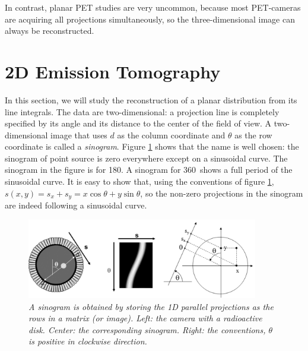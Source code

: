 \documentclass[11pt,oneside]{book}
\begin{document}
In contrast, planar PET studies are very uncommon, because most PET-cameras
are acquiring all projections simultaneously, so the three-dimensional image
can always be reconstructed.

\section{2D Emission Tomography}

In this section, we will study the reconstruction of a planar distribution
from its line integrals. The data are two-dimensional: a projection line is
completely specified by its angle and its distance to the center of the field
of view. A two-dimensional image that uses $d$ as the column coordinate and
$\theta$ as the row coordinate is called a {\em sinogram}. Figure
\ref{fig:sinogram} shows that the name is well chosen: the sinogram of point
source is zero everywhere except on a sinusoidal curve. The sinogram in the
figure is for 180\textdegree. A sinogram for 360\textdegree\ shows a full period of
the sinusoidal curve. It is easy to show that, using the conventions of figure
\ref{fig:sinogram}, $s(x,y) = s_x + s_y = x \cos \theta + y \sin \theta$, so
the non-zero projections in the sinogram are indeed following a sinusoidal
curve.

\begin{figure}[tb]
\centering
\includegraphics[width=0.9\textwidth]{figs/fig_sinogram.pdf}
\caption{\label{fig:sinogram} \emph{A sinogram is obtained by storing the 1D
parallel projections as the rows in a matrix (or image). Left: the camera with
a radioactive disk. Center: the corresponding sinogram. Right: the
conventions, $\theta$ is positive in clockwise direction.}}
\end{figure}
\end{document}
